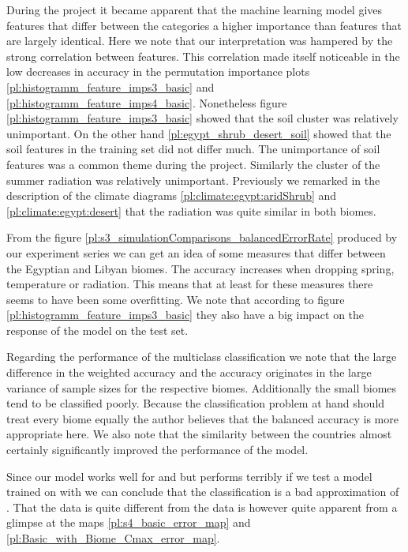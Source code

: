 During the project it became apparent that the machine learning model gives features that differ between the
categories a higher importance than features that are largely identical.
Here we note that our interpretation was hampered by the strong correlation between features.
This correlation made itself noticeable in the low decreases in accuracy in the permutation importance plots
\ref{pl:histogramm_feature_imps3_basic} and \ref{pl:histogramm_feature_imps4_basic}.
Nonetheless figure \ref{pl:histogramm_feature_imps3_basic} showed that the soil cluster was
relatively unimportant.
On the other hand \ref{pl:egypt_shrub_desert_soil} showed that the soil features in the training set did not differ much.
The unimportance of soil features was a common theme during the project.
Similarly the cluster of the summer radiation was relatively unimportant.
Previously we remarked in the description of the climate diagrams
\ref{pl:climate:egypt:aridShrub} and \ref{pl:climate:egypt:desert}
that the radiation was quite similar in both biomes.

From the figure \ref{pl:s3_simulationComparisons_balancedErrorRate} produced by our experiment series 
we can get an idea of some measures that differ between the Egyptian and Libyan biomes. The accuracy 
increases when dropping spring, temperature or radiation. This means that at least for these measures there seems to have been some overfitting.
We note that according to figure \ref{pl:histogramm_feature_imps3_basic} they also have a big impact on the response of the model on the test set.

Regarding the performance of the multiclass classification we note that the large difference in the weighted accuracy and the accuracy
originates in the large variance of sample sizes for the respective biomes.
Additionally the small biomes tend to be classified poorly.
Because the classification problem at hand should treat every biome
equally the author believes that the balanced accuracy is more appropriate here.
We also note that the similarity between the countries almost certainly significantly improved the
performance of the model.

Since our model works well for  and  but performs terribly
if we test a model trained on  with   we can conclude that the
 classification is a bad approximation of . That the  
data is quite different from the   data is however quite apparent from a glimpse at the
maps \ref{pl:s4_basic_error_map} and \ref{pl:Basic_with_Biome_Cmax_error_map}.

